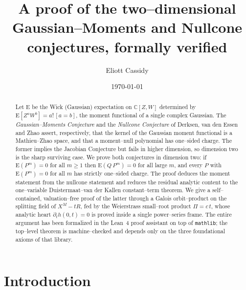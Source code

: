 \documentclass[11pt,reqno]{amsart}
\theoremstyle{plain}
\theoremstyle{definition}
\newcommand{\C}{\mathbb{C}}
\newcommand{\E}{\mathrm{E}}
\begin{document}
\title[The Gaussian--Moments and Nullcone conjectures in dimension two]
{A proof of the two--dimensional Gaussian--Moments and Nullcone conjectures,
formally verified}

\author{Eliott Cassidy}


\date{\today}

\begin{abstract}
Let $\E$ be the Wick (Gaussian) expectation on $\C[Z,W]$ determined by
$\E[Z^aW^b]=a!\,[a=b]$, the moment functional of a single complex Gaussian.
The \emph{Gaussian--Moments Conjecture} and the \emph{Nullcone Conjecture} of
Derksen, van den Essen and Zhao assert, respectively, that the kernel of the
Gaussian moment functional is a Mathieu--Zhao space, and that a moment--null polynomial has
one--sided charge. The former implies the Jacobian Conjecture but fails in higher dimension, so
dimension two is the sharp surviving case. We prove both conjectures in dimension two: if
$\E(P^m)=0$ for all $m\ge 1$ then $\E(Q\,P^m)=0$ for all large $m$, and every $P$ with $\E(P^m)=0$
for all $m$ has strictly one--sided charge. The proof deduces the moment statement from the
nullcone statement and reduces the residual analytic content to the one--variable
Duistermaat--van der Kallen constant--term theorem. We give a self--contained, valuation--free proof of the latter through a
Galois orbit--product on the splitting field of $X^{M}-tR$, fed by the Weierstrass small--root
product $\Pi=c\,t$, whose analytic heart $\partial_t h(0,t)=0$ is proved inside a single power--series
frame. The entire argument has been formalized in the Lean~4 proof assistant on top of
\texttt{mathlib}; the top--level theorem is machine--checked and depends only on the three
foundational axioms of that library.
\end{abstract}

\maketitle

\section{Introduction}
\end{document}
